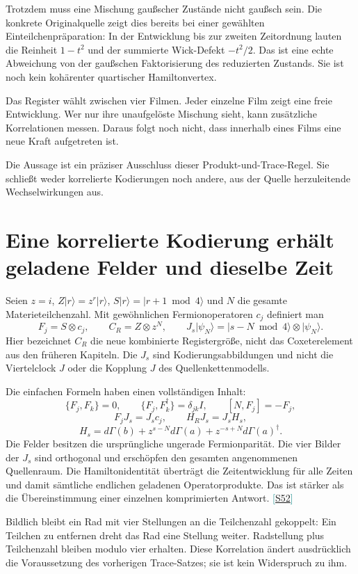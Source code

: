 \documentclass[11pt,a4paper,oneside,parskip=half,headings=normal,numbers=noenddot,bibliography=totoc]{scrreprt}
\newcommand{\ket}[1]{\lvert #1\rangle}
\newcommand{\src}[1]{\textcolor{teal}{\small[\hyperref[s:#1]{S#1}]}}
\newcommand{\finding}[2]{\begin{tcolorbox}[enhanced,breakable,colback=pale,colframe=teal,boxrule=0pt,borderline west={2pt}{0pt}{teal},arc=0mm,left=3mm,right=3mm,top=2mm,bottom=2mm,title={#1},coltitle=ink,colbacktitle=pale,fonttitle=\sffamily\bfseries]#2\end{tcolorbox}}
\begin{document}
Trotzdem muss eine Mischung gaußscher Zustände nicht gaußsch sein. Die konkrete Originalquelle zeigt dies bereits bei einer gewählten Einteilchenpräparation: In der Entwicklung bis zur zweiten Zeitordnung lauten die Reinheit $1-t^2$ und der summierte Wick-Defekt $-t^2/2$. Das ist eine echte Abweichung von der gaußschen Faktorisierung des reduzierten Zustands. Sie ist noch kein kohärenter quartischer Hamiltonvertex.

\finding{Ein einfaches Bild}{Das Register wählt zwischen vier Filmen. Jeder einzelne Film zeigt eine freie Entwicklung. Wer nur ihre unaufgelöste Mischung sieht, kann zusätzliche Korrelationen messen. Daraus folgt noch nicht, dass innerhalb eines Films eine neue Kraft aufgetreten ist.}

Die Aussage ist ein präziser Ausschluss dieser Produkt-und-Trace-Regel. Sie schließt weder korrelierte Kodierungen noch andere, aus der Quelle herzuleitende Wechselwirkungen aus.

\section{Eine korrelierte Kodierung erhält geladene Felder und dieselbe Zeit}
Seien $z=i$, $Z\ket r=z^r\ket r$, $S\ket r=\ket{r+1\bmod4}$ und $N$ die gesamte Materieteilchenzahl. Mit gewöhnlichen Fermionoperatoren $c_j$ definiert man
\[
 F_j=S\otimes c_j,\qquad
 C_R=Z\otimes z^N,\qquad
 J_s\ket{\psi_N}=\ket{s-N\bmod4}\otimes\ket{\psi_N}.
\]
Hier bezeichnet $C_R$ die neue kombinierte Registergröße, nicht das Coxeterelement aus den früheren Kapiteln. Die $J_s$ sind Kodierungsabbildungen und nicht die Viertelclock $J$ oder die Kopplung $J$ des Quellenkettenmodells.

Die einfachen Formeln haben einen vollständigen Inhalt:
\[
 \{F_j,F_k\}=0,\qquad
 \{F_j,F_k^\dagger\}=\delta_{jk}I,\qquad
 [N,F_j]=-F_j,
\]
\[
 F_jJ_s=J_sc_j,\qquad H_RJ_s=J_sH_s,
\]
\[
 H_s=d\Gamma(b)+z^{s-N}d\Gamma(a)+z^{-s+N}d\Gamma(a)^\dagger.
\]
Die Felder besitzen die ursprüngliche ungerade Fermionparität. Die vier Bilder der $J_s$ sind orthogonal und erschöpfen den gesamten angenommenen Quellenraum. Die Hamiltonidentität überträgt die Zeitentwicklung für alle Zeiten und damit sämtliche endlichen geladenen Operatorprodukte. Das ist stärker als die Übereinstimmung einer einzelnen komprimierten Antwort. \src{52}

Bildlich bleibt ein Rad mit vier Stellungen an die Teilchenzahl gekoppelt: Ein Teilchen zu entfernen dreht das Rad eine Stellung weiter. Radstellung plus Teilchenzahl bleiben modulo vier erhalten. Diese Korrelation ändert ausdrücklich die Voraussetzung des vorherigen Trace-Satzes; sie ist kein Widerspruch zu ihm.
\end{document}
